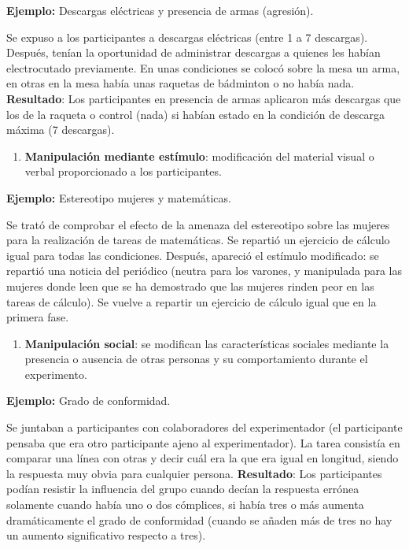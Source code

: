 \documentclass[
]{website}
\providecommand{\tightlist}{%
  \setlength{\itemsep}{0pt}\setlength{\parskip}{0pt}}
\begin{document}
\textbf{Ejemplo:} Descargas eléctricas y presencia de armas (agresión).

Se expuso a los participantes a descargas eléctricas (entre 1 a 7 descargas). Después, tenían la oportunidad de administrar descargas a quienes les habían electrocutado previamente. En unas condiciones se colocó sobre la mesa un arma, en otras en la mesa había unas raquetas de bádminton o no había nada. \textbf{Resultado}: Los participantes en presencia de armas aplicaron más descargas que los de la raqueta o control (nada) si habían estado en la condición de descarga máxima (7 descargas).

\begin{enumerate}
\def\labelenumi{\arabic{enumi}.}
\setcounter{enumi}{1}
\tightlist
\item
  \textbf{Manipulación mediante estímulo}: modificación del material visual o verbal proporcionado a los participantes.
\end{enumerate}

\textbf{Ejemplo:} Estereotipo mujeres y matemáticas.

Se trató de comprobar el efecto de la amenaza del estereotipo sobre las mujeres para la realización de tareas de matemáticas. Se repartió un ejercicio de cálculo igual para todas las condiciones. Después, apareció el estímulo modificado: se repartió una noticia del periódico (neutra para los varones, y manipulada para las mujeres donde leen que se ha demostrado que las mujeres rinden peor en las tareas de cálculo). Se vuelve a repartir un ejercicio de cálculo igual que en la primera fase.

\begin{enumerate}
\def\labelenumi{\arabic{enumi}.}
\setcounter{enumi}{2}
\tightlist
\item
  \textbf{Manipulación social}: se modifican las características sociales mediante la presencia o ausencia de otras personas y su comportamiento durante el experimento.
\end{enumerate}

\textbf{Ejemplo:} Grado de conformidad.

Se juntaban a participantes con colaboradores del experimentador (el participante pensaba que era otro participante ajeno al experimentador). La tarea consistía en comparar una línea con otras y decir cuál era la que era igual en longitud, siendo la respuesta muy obvia para cualquier persona. \textbf{Resultado}: Los participantes podían resistir la influencia del grupo cuando decían la respuesta errónea solamente cuando había uno o dos cómplices, si había tres o más aumenta dramáticamente el grado de conformidad (cuando se añaden más de tres no hay un aumento significativo respecto a tres).
\end{document}

